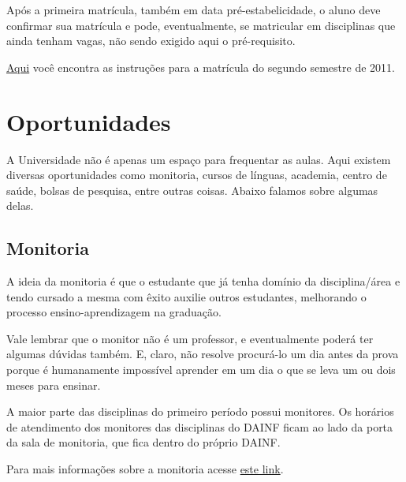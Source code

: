 \documentclass[a4paper,12pt,openany]{article}
\begin{document}
Após a primeira matrícula, também em data pré-estabelicidade, o aluno deve confirmar sua matrícula e pode, eventualmente, se matricular em disciplinas que ainda tenham vagas, não sendo exigido aqui o pré-requisito. 

 \href{http://www.utfpr.edu.br/curitiba/alunos/08-07-11-instrucao-de-matricula-bacharelados-e-licenciaturas/view}{Aqui} você encontra as instruções para a matrícula do segundo semestre de 2011. 



\newpage
\section{Oportunidades}

A Universidade não é apenas um espaço para frequentar as aulas. Aqui existem diversas oportunidades como monitoria, cursos de línguas, academia, centro de saúde, bolsas de pesquisa, entre outras coisas. Abaixo falamos sobre algumas delas.


\subsection{Monitoria}

A ideia da monitoria é que o estudante que já tenha domínio da disciplina/área e tendo cursado a mesma com êxito auxilie outros estudantes, melhorando o processo ensino-aprendizagem na graduação. 

Vale lembrar que o monitor não é um professor, e eventualmente poderá ter algumas dúvidas também. E, claro, não resolve procurá-lo um dia antes da prova porque é humanamente impossível aprender em um dia o que se leva um ou dois meses para ensinar.

A maior parte das disciplinas do primeiro período possui monitores. Os horários de atendimento dos monitores das disciplinas do DAINF ficam ao lado da porta da sala de monitoria, que fica dentro do próprio DAINF.

Para mais informações sobre a monitoria acesse \href{http://www.utfpr.edu.br/estrutura-universitaria/pro-reitorias/prograd/programas-academicos/programa-de-monitoria}{este link}.
\end{document}
